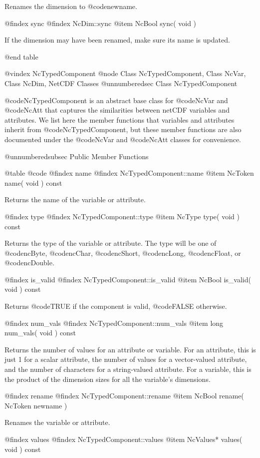 Renames the dimension to @code{newname}.

@findex sync
@findex NcDim::sync
@item NcBool sync( void )

If the dimension may have been renamed, make sure its name is updated.

@end table

@vindex NcTypedComponent
@node Class NcTypedComponent, Class NcVar, Class NcDim, NetCDF Classes
@unnumberedsec  Class NcTypedComponent

@code{NcTypedComponent} is an abstract base class for @code{NcVar} and
@code{NcAtt} that captures the similarities between netCDF variables and
attributes.  We list here the member functions that variables and
attributes inherit from @code{NcTypedComponent}, but these member
functions are also documented under the @code{NcVar} and @code{NcAtt}
classes for convenience.

@unnumberedsubsec Public Member Functions

@table @code
@findex name
@findex NcTypedComponent::name
@item NcToken name( void ) const

Returns the name of the variable or attribute.

@findex type
@findex NcTypedComponent::type
@item NcType type( void ) const

Returns the type of the variable or attribute.  The type will be one of
@code{ncByte}, @code{ncChar}, @code{ncShort}, @code{ncLong},
@code{ncFloat}, or @code{ncDouble}.

@findex is_valid
@findex NcTypedComponent::is_valid
@item NcBool is_valid( void ) const

Returns @code{TRUE} if the component is valid, @code{FALSE} otherwise.

@findex num_vals
@findex NcTypedComponent::num_vals
@item long num_vals( void ) const

Returns the number of values for an attribute or variable.  For an
attribute, this is just 1 for a scalar attribute, the number of values
for a vector-valued attribute, and the number of characters for a
string-valued attribute.  For a variable, this is the product of the
dimension sizes for all the variable's dimensions.

@findex rename
@findex NcTypedComponent::rename
@item NcBool rename( NcToken newname )

Renames the variable or attribute.

@findex values
@findex NcTypedComponent::values
@item NcValues* values( void ) const

